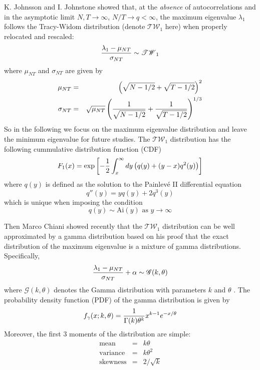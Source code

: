 K. Johnsson \cite{Johnsson2000} and I. Johnstone \cite{Johnstone2001}
showed that, at the {\it absence} of autocorrelations and in the
asymptotic limit $N, T \to \infty$, $N/T \to q < \infty$, the maximum
eigenvalue  $\lambda_1$ follows the Tracy-Widom distribution (denote
$\mathscr{TW}_1$ here) when properly relocated and rescaled:
\begin{equation*}
  {\lambda_1 - \mu_{NT} \over \sigma_{NT}} \sim \mathscr{TW}_1
\end{equation*}
where $\mu_{NT}$ and $\sigma_{NT}$ are given by
\begin{eqnarray*}
  \mu_{NT} &=& \left(
    \sqrt{N-1/2} + \sqrt{T - 1/2}
  \right)^2 \\
  \sigma_{NT} &=& \sqrt{\mu_{NT}} \left(
    {1 \over \sqrt{N-1/2}} + {1 \over \sqrt{T-1/2}}
  \right)^{1/3}
\end{eqnarray*}
So in the following we focus on the maximum eigenvalue distribution
and leave the minimum eigenvalue for future studies. The
$\mathscr{TW}_1$ distribution has the following cummulative
distribution function (CDF) \cite{Chiani2012}
\begin{equation*}
  F_1(x) = \exp\left[
    -{1 \over 2} \int_x^\infty dy \left(q(y) + (y-x)q^2(y)\right)
  \right]
\end{equation*}
where $q(y)$ is defined as the solution to the Painlev\'e II differential
equation
\begin{equation*}
  q''(y) = yq(y) + 2q^3(y)
\end{equation*}
which is unique when imposing the condition
\begin{equation*}
  q(y) \sim \text{Ai}(y) \text{ as } y \to \infty
\end{equation*}

Then Marco Chiani showed recently that the $\mathscr{TW}_1$ distribution
can be well approximated by a gamma distribution based on his proof
that the exact distribution of the maximum eigenvalue is a mixture of
gamma distributions. Specifically,
\begin{equation}\label{eq:TracyWidom-Gamma}
  {\lambda_1 - \mu_{NT} \over \sigma_{NT}} + \alpha \sim
  \mathscr{G}(k ,\theta)
\end{equation}
where $\mathscr{G}(k, \theta)$ denotes the Gamma distribution with
parameters $k$ and $\theta$ \cite{Chiani2012}. The probability
density function (PDF) of the gamma distribution is given by
\begin{equation*}
  f_\gamma(x; k, \theta) = {1 \over \Gamma(k) \theta^k} x^{k-1}
  e^{-x/\theta}
\end{equation*}
Moreover, the first 3 moments of the distribution are simple:
\begin{eqnarray*}
  \text{mean} &=& k\theta \\
  \text{variance} &=& k\theta^2 \\
  \text{skewness} &=& 2/\sqrt{k}
\end{eqnarray*}

